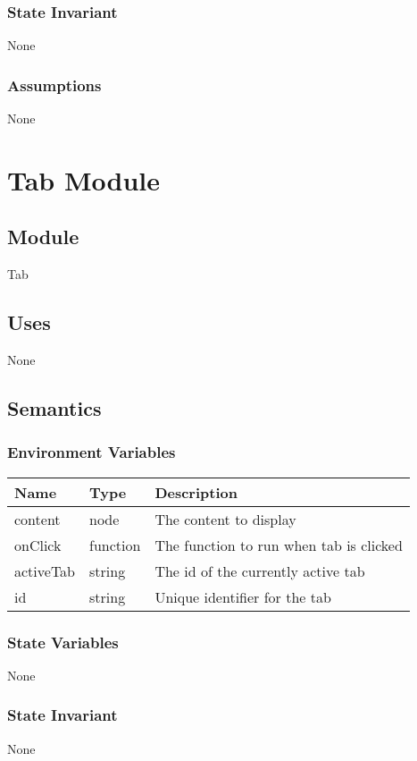 \documentclass[12pt]{article}
\begin{document}
\subsubsection{State Invariant}
None

\subsubsection{Assumptions}
None

\newpage


\section{Tab Module}

\subsection{Module}
Tab

\subsection{Uses}
None

\subsection{Semantics}

\subsubsection{Environment Variables}
\begin{tabular}{| l | l | p{10cm} |}
    \hline
    \textbf{Name} & \textbf{Type} & \textbf{Description}\\ \hline
    content & node & The content to display\\ \hline
    onClick & function & The function to run when tab is clicked\\ \hline
    activeTab & string & The id of the currently active tab\\ \hline
    id & string & Unique identifier for the tab\\ \hline
\end{tabular}

\subsubsection{State Variables}
None

\subsubsection{State Invariant}
None
\end{document}
